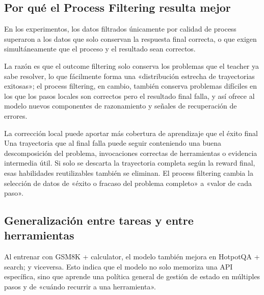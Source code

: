 \subsection{Por qué el Process Filtering resulta mejor}

En los experimentos, los datos filtrados únicamente por calidad de process superaron a los datos que solo conservan la respuesta final correcta, o que exigen simultáneamente que el proceso y el resultado sean correctos.


La razón es que el outcome filtering solo conserva los problemas que el teacher ya sabe resolver, lo que fácilmente forma una «distribución estrecha de trayectorias exitosas»; el process filtering, en cambio, también conserva problemas difíciles en los que los pasos locales son correctos pero el resultado final falla, y así ofrece al modelo nuevos componentes de razonamiento y señales de recuperación de errores.

\begin{importantbox}{La corrección local puede aportar más cobertura de aprendizaje que el éxito final}
Una trayectoria que al final falla puede seguir conteniendo una buena descomposición del problema, invocaciones correctas de herramientas o evidencia intermedia útil. Si solo se descarta la trayectoria completa según la reward final, esas habilidades reutilizables también se eliminan. El process filtering cambia la selección de datos de «éxito o fracaso del problema completo» a «valor de cada paso».
\end{importantbox}

\subsection{Generalización entre tareas y entre herramientas}

Al entrenar con GSM8K + calculator, el modelo también mejora en HotpotQA + search; y viceversa. Esto indica que el modelo no solo memoriza una API específica, sino que aprende una política general de gestión de estado en múltiples pasos y de «cuándo recurrir a una herramienta».



